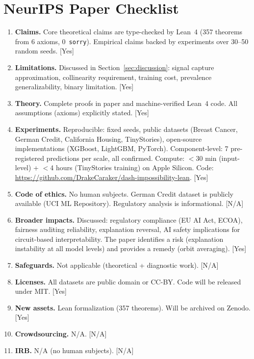 \documentclass{article}
\begin{document}



\newpage
\section*{NeurIPS Paper Checklist}

\begin{enumerate}
\item \textbf{Claims.} Core theoretical claims are type-checked by Lean~4 (357 theorems from 6 axioms, 0~\texttt{sorry}). Empirical claims backed by experiments over 30--50 random seeds. [Yes]

\item \textbf{Limitations.} Discussed in Section~\ref{sec:discussion}: signal capture approximation, collinearity requirement, training cost, prevalence generalizability, binary limitation. [Yes]

\item \textbf{Theory.} Complete proofs in paper and machine-verified Lean~4 code. All assumptions (axioms) explicitly stated. [Yes]

\item \textbf{Experiments.} Reproducible: fixed seeds, public datasets (Breast Cancer, German Credit, California Housing, TinyStories), open-source implementations (XGBoost, LightGBM, PyTorch). Component-level: 7 pre-registered predictions per scale, all confirmed. Compute: $<$30 min (input-level) + $<$4 hours (TinyStories training) on Apple Silicon. Code: \url{https://github.com/DrakeCaraker/dash-impossibility-lean}. [Yes]

\item \textbf{Code of ethics.} No human subjects. German Credit dataset is publicly available (UCI ML Repository). Regulatory analysis is informational. [N/A]

\item \textbf{Broader impacts.} Discussed: regulatory compliance (EU AI Act, ECOA), fairness auditing reliability, explanation reversal, AI safety implications for circuit-based interpretability. The paper identifies a risk (explanation instability at all model levels) and provides a remedy (orbit averaging). [Yes]

\item \textbf{Safeguards.} Not applicable (theoretical + diagnostic work). [N/A]
\item \textbf{Licenses.} All datasets are public domain or CC-BY. Code will be released under MIT. [Yes]
\item \textbf{New assets.} Lean formalization (357 theorems). Will be archived on Zenodo. [Yes]
\item \textbf{Crowdsourcing.} N/A. [N/A]
\item \textbf{IRB.} N/A (no human subjects). [N/A]
\end{enumerate}
\end{document}
